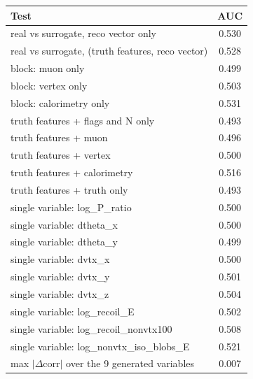 \begin{tabular}{lc}
\toprule
Test & AUC \\
\midrule
real vs surrogate, reco vector only & 0.530 \\
real vs surrogate, (truth features, reco vector) & 0.528 \\
\midrule
block: muon only & 0.499 \\
block: vertex only & 0.503 \\
block: calorimetry only & 0.531 \\
truth features + flags and N only & 0.493 \\
truth features + muon & 0.496 \\
truth features + vertex & 0.500 \\
truth features + calorimetry & 0.516 \\
truth features + truth only & 0.493 \\
single variable: log\_P\_ratio & 0.500 \\
single variable: dtheta\_x & 0.500 \\
single variable: dtheta\_y & 0.499 \\
single variable: dvtx\_x & 0.500 \\
single variable: dvtx\_y & 0.501 \\
single variable: dvtx\_z & 0.504 \\
single variable: log\_recoil\_E & 0.502 \\
single variable: log\_recoil\_nonvtx100 & 0.508 \\
single variable: log\_nonvtx\_iso\_blobs\_E & 0.521 \\
\midrule
max $|\Delta$corr$|$ over the 9 generated variables & 0.007 \\
\bottomrule
\end{tabular}
